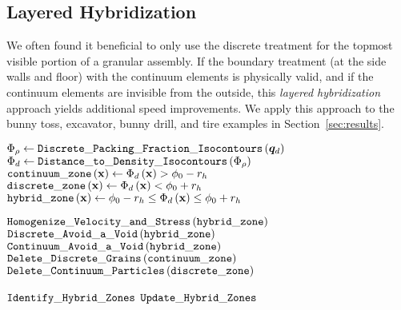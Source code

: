 \subsection{Layered Hybridization}
\label{sec:layered_3D}
We often found it beneficial to only use the discrete treatment for the topmost visible portion of a granular assembly. If the boundary treatment (at the side walls and floor) with the continuum elements is physically valid, and if the continuum elements are invisible from the outside, this \textit{layered hybridization} approach yields additional speed improvements. We apply this approach to the bunny toss, excavator, bunny drill, and tire examples in Section~\ref{sec:results}.

\begin{algorithm}
\caption{${\tt Identify \_ Hybrid \_ Zones}$}
\begin{algorithmic}[1]
\State $\Phi_{\rho} \gets {\tt Discrete \_ Packing \_ Fraction \_ Isocontours}\left(\boldsymbol{q}_d\right)$
\State $\Phi_{d} \gets {\tt Distance \_ to \_ Density \_ Isocontours}\left(\Phi_{\rho}\right)$
\State ${\tt continuum \_ zone}\left( \mathbf{x} \right) \gets \Phi_{d}\left( \mathbf{x} \right) > \phi_0 - r_h$
\State ${\tt discrete \_ zone}\left( \mathbf{x} \right) \gets \Phi_{d}\left( \mathbf{x} \right) < \phi_0 + r_h$
\State ${\tt hybrid \_ zone}\left( \mathbf{x} \right) \gets \phi_0 - r_h \leq \Phi_{d}\left( \mathbf{x} \right) \leq \phi_0 + r_h$
\end{algorithmic} \label{alg:identify_hybrid_zones}
\end{algorithm}

\begin{algorithm}
\caption{${\tt Update \_ Hybrid \_ Zones}$}
\begin{algorithmic}[1]
\State ${\tt Homogenize \_ Velocity \_ and \_ Stress}\left( {\tt hybrid \_ zone} \right)$ 
\State ${\tt Discrete \_ Avoid \_ a \_ Void}\left( {\tt hybrid \_ zone} \right)$ 
\State ${\tt Continuum \_ Avoid \_ a \_ Void}\left( {\tt hybrid \_ zone} \right)$ 
\State ${\tt Delete \_ Discrete \_ Grains}\left( {\tt continuum \_ zone} \right)$ 
\State ${\tt Delete \_ Continuum \_ Particles}\left( {\tt discrete \_ zone} \right)$ 
\end{algorithmic} \label{alg:update_hybrid_zones}
\end{algorithm}

\begin{algorithm}
\caption{${\tt Update \_ Hybrid \_ State}$}
\begin{algorithmic}[1]
\State ${\tt Identify \_ Hybrid \_ Zones}$
\State ${\tt Update \_ Hybrid \_ Zones}$
\end{algorithmic} \label{alg:update_hybrid_state}
\end{algorithm}

